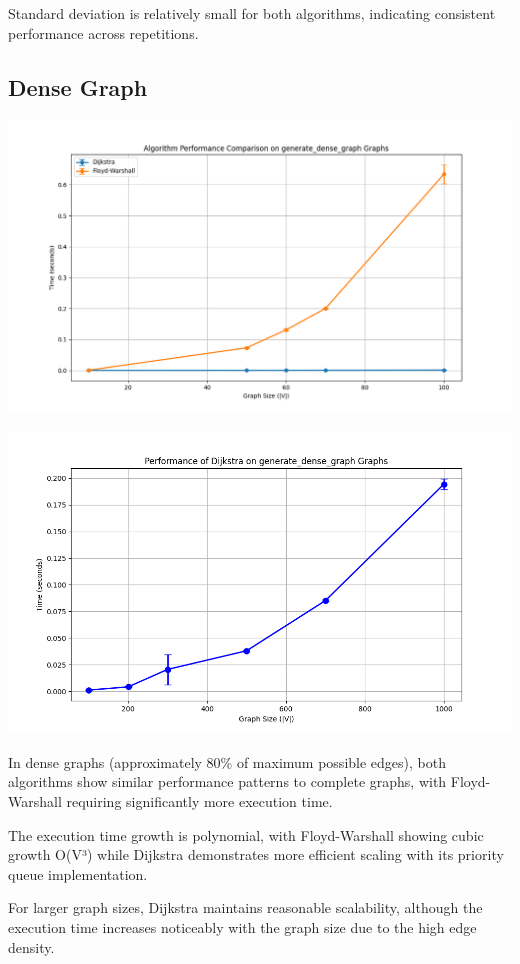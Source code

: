\documentclass[a4paper,12pt]{article}
\begin{document}
Standard deviation is relatively small for both algorithms, indicating consistent performance across repetitions.
\subsection{Dense Graph}
\label{sec:orgfbdb423}
\begin{center}
\includegraphics[width=.9\linewidth]{dijkstra_floyd_dense.png}
\label{org06ae0d3}
\end{center}
\begin{center}
\includegraphics[width=.9\linewidth]{dijkstra_dense.png}
\label{orgf77082e}
\end{center}

In dense graphs (approximately 80\% of maximum possible edges), both algorithms show similar performance patterns to complete graphs, with Floyd-Warshall requiring significantly more execution time.

The execution time growth is polynomial, with Floyd-Warshall showing cubic growth O(V³) while Dijkstra demonstrates more efficient scaling with its priority queue implementation.

For larger graph sizes, Dijkstra maintains reasonable scalability, although the execution time increases noticeably with the graph size due to the high edge density.
\end{document}
